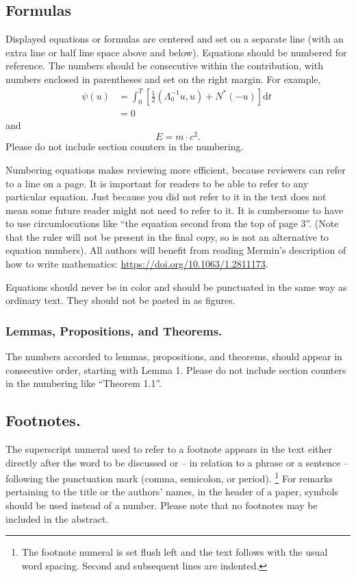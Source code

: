 \documentclass[runningheads]{llncs}
\begin{document}
\subsection{Formulas}
Displayed equations or formulas are centered and set on a separate line (with an extra line or half line space above and below). 
Equations should be numbered for reference. 
The numbers should be consecutive within the contribution, with numbers enclosed in parentheses and set on the right margin.
For example,
\begin{align}
  \psi (u) & = \int_{0}^{T} \left[\frac{1}{2}
  \left(\Lambda_{0}^{-1} u,u\right) + N^{\ast} (-u)\right] \text{d}t \; \\
& = 0
\end{align}
and 
\begin{equation}
  E = m\cdot c^2.
  \label{eq:important}
\end{equation}
Please do not include section counters in the numbering.

Numbering equations makes reviewing more efficient, because reviewers can refer to a line on a page.  
It is important for readers to be able to refer to any particular equation.
Just because you did not refer to it in the text does not mean some future reader might not need to refer to it.
It is cumbersome to have to use circumlocutions like ``the equation second from the top of page 3''.
(Note that the ruler will not be present in the final copy, so is not an alternative to equation numbers).
All authors will benefit from reading Mermin's description of how to write mathematics:
\url{https://doi.org/10.1063/1.2811173}.

Equations should never be in color and should be punctuated in the same way as ordinary text.
They should not be pasted in as figures.


\subsubsection{Lemmas, Propositions, and Theorems.}
The numbers accorded to lemmas, propositions, and theorems, \etc should appear in consecutive order, starting with Lemma 1. 
Please do not include section counters in the numbering like ``Theorem 1.1''.


\subsection{Footnotes.}
The superscript numeral used to refer to a footnote appears in the text either directly after the word to be discussed or -- in relation to a phrase or a sentence -- following the punctuation mark (comma, semicolon, or period).%
\footnote{The footnote numeral is set flush left and the text follows with the usual word spacing. 
  Second and subsequent lines are indented. 
}
For remarks pertaining to the title or the authors' names, in the header of a paper, symbols should be used instead of a number.
Please note that no footnotes may be included in the abstract.
\end{document}
